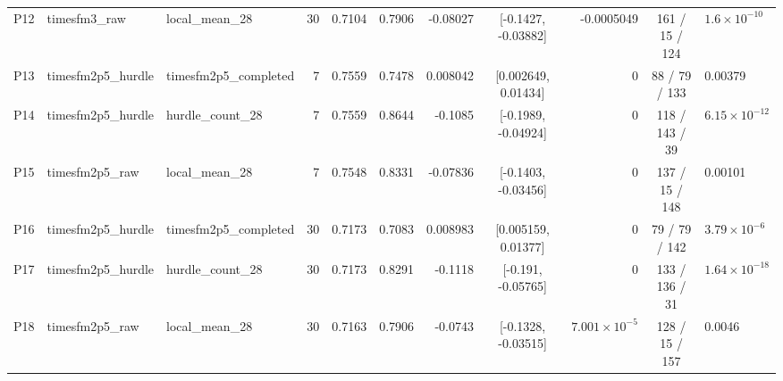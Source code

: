 \begin{table}
\begin{tabular}{lllrrrrcrcl}
P12 & timesfm3\_raw & local\_mean\_28 & 30 & 0.7104 & 0.7906 & -0.08027 & [-0.1427, -0.03882] & -0.0005049 & 161 / 15 / 124 & $1.6 \times 10^{-10}$ \\
P13 & timesfm2p5\_hurdle & timesfm2p5\_completed & 7 & 0.7559 & 0.7478 & 0.008042 & [0.002649, 0.01434] & 0 & 88 / 79 / 133 & 0.00379 \\
P14 & timesfm2p5\_hurdle & hurdle\_count\_28 & 7 & 0.7559 & 0.8644 & -0.1085 & [-0.1989, -0.04924] & 0 & 118 / 143 / 39 & $6.15 \times 10^{-12}$ \\
P15 & timesfm2p5\_raw & local\_mean\_28 & 7 & 0.7548 & 0.8331 & -0.07836 & [-0.1403, -0.03456] & 0 & 137 / 15 / 148 & 0.00101 \\
P16 & timesfm2p5\_hurdle & timesfm2p5\_completed & 30 & 0.7173 & 0.7083 & 0.008983 & [0.005159, 0.01377] & 0 & 79 / 79 / 142 & $3.79 \times 10^{-6}$ \\
P17 & timesfm2p5\_hurdle & hurdle\_count\_28 & 30 & 0.7173 & 0.8291 & -0.1118 & [-0.191, -0.05765] & 0 & 133 / 136 / 31 & $1.64 \times 10^{-18}$ \\
P18 & timesfm2p5\_raw & local\_mean\_28 & 30 & 0.7163 & 0.7906 & -0.0743 & [-0.1328, -0.03515] & $7.001 \times 10^{-5}$ & 128 / 15 / 157 & 0.0046 \\
\bottomrule
\end{tabular}
\end{table}

